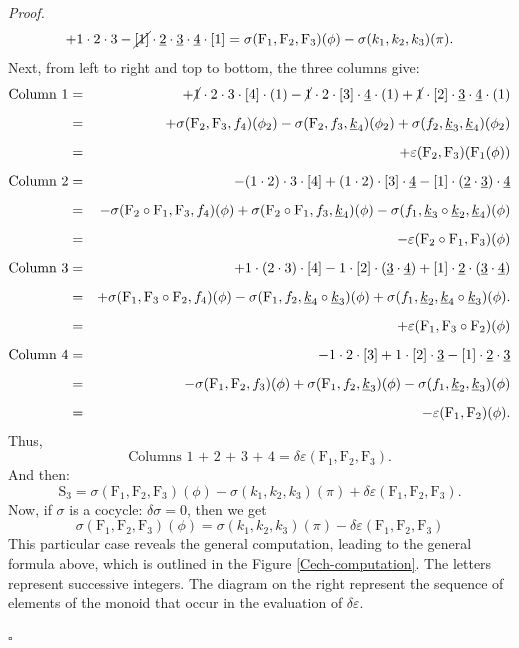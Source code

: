 \documentclass[12pt,reqno]{amsart}
\theoremstyle{article}
\renewenvironment{proof}{\noindent \textit{Proof.}} {\nolinebreak\hfill $\square$}
\def \F{\mathrm F}
\def \S{\mathrm S}
\newcommand{\ul}{\underline}
\let \epsilon=\varepsilon
\begin{document}
\begin{proof}
$$    + 1\cdot 2\cdot 3 - \cancel{[1]}\cdot \ul2\cdot \ul3\cdot \ul4\cdot[1] = \sigma(\F_1,\F_2,\F_3)(\phi) - \sigma(k_1,k_2,k_3)(\pi).
    $$
    Next,
    from left to right and top to bottom,
    the three columns give:
    \begin{eqnarray*}
      \allowdisplaybreaks
      \text{Column 1} & = &  + \cancel 1\cdot 2\cdot 3\cdot [4]\cdot(1) - \cancel 1\cdot 2\cdot [3]\cdot \ul4\cdot(1) + \cancel 1\cdot [2]\cdot \ul3\cdot \ul4\cdot(1)\\[.2cm]
      & = & + \sigma(\F_2,\F_3,f_4)(\phi_2) - \sigma(\F_2,f_3,\ul k_4)(\phi_2) + \sigma(f_2,\ul k_3,\ul k_4)(\phi_2)\\[.2cm]
      & = & + \epsilon (\F_2,\F_3)(\F_1(\phi))\\[.2cm]
      \text{Column 2} & = &  - (1\cdot 2)\cdot 3\cdot [4] + (1\cdot 2)\cdot [3]\cdot \ul4 - [1] \cdot (\ul2\cdot \ul3)\cdot\ul4 \\[.2cm]
      & = & - \sigma(\F_2\circ \F_1,\F_3,f_4)(\phi) + \sigma(\F_2 \circ \F_1,f_3, \ul k_4)(\phi) - \sigma(f_1,\ul k_3 \circ \ul k_2 ,\ul k_4)(\phi)\\[.2cm]
      & = & - \epsilon(\F_2 \circ \F_1,\F_3)(\phi) \\[.2cm]
      \text{Column 3} & = &  + 1 \cdot (2 \cdot 3) \cdot [4] - 1 \cdot [2] \cdot (\ul3 \cdot \ul4) + [1] \cdot \ul2 \cdot (\ul3\cdot \ul4) \\[.2cm]
      & = & + \sigma(\F_1,\F_3\circ\F_2,f_4)(\phi) - \sigma(\F_1,f_2,\ul k_4 \circ \ul k_3)(\phi) + \sigma(f_1,\ul k_2, \ul k_4 \circ \ul k_3)(\phi).\\[.2cm]
      & = & + \epsilon(\F_1,\F_3 \circ \F_2)(\phi) \\[.2cm]
      \text{Column 4} & = &  - 1 \cdot 2 \cdot [3] + 1 \cdot [2] \cdot \ul3 - [1] \cdot \ul2 \cdot \ul3 \\[.2cm]
      & = & - \sigma(\F_1,\F_2,f_3)(\phi) + \sigma(\F_1, f_2, \ul k_3)(\phi) - \sigma(f_1,\ul k_2 ,\ul k_3)(\phi) \\[.2cm]
      & = & - \epsilon(\F_1,\F_2)(\phi).
    \end{eqnarray*}
    Thus,
    $$
    \text{Columns 1 + 2 + 3 + 4} = \delta\epsilon(\F_1,\F_2,\F_3).
    $$
    And then:
    $$
    \S_3 = \sigma(\F_1,\F_2,\F_3)(\phi) - \sigma(k_1,k_2,k_3)(\pi) + \delta \epsilon(\F_1,\F_2,\F_3).
    $$
    Now, if $\sigma$ is a cocycle:
    $\delta\sigma = 0$,
    then we get
    $$
    \sigma(\F_1,\F_2,\F_3)(\phi) = \sigma(k_1,k_2,k_3)(\pi) - \delta \epsilon(\F_1,\F_2,\F_3)
    $$
    This particular case reveals the general computation,
    leading to the general formula above,
    which is outlined in the Figure \ref{Cech-computation}.
    The letters represent successive integers.
    The diagram on the right represent the sequence of elements of the monoid that occur in the evaluation of $\delta\epsilon$.
    

\end{proof}
\end{document}
